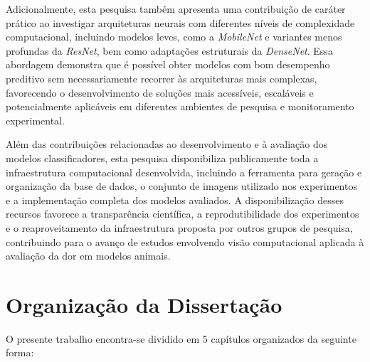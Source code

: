 Adicionalmente, esta pesquisa também apresenta uma contribuição de caráter prático ao investigar arquiteturas neurais com diferentes níveis de complexidade computacional, incluindo modelos leves, como a \textit{MobileNet} e variantes menos profundas da \textit{ResNet}, bem como adaptações estruturais da \textit{DenseNet}. Essa abordagem demonstra que é possível obter modelos com bom desempenho preditivo sem necessariamente recorrer às arquiteturas mais complexas, favorecendo o desenvolvimento de soluções mais acessíveis, escaláveis e potencialmente aplicáveis em diferentes ambientes de pesquisa e monitoramento experimental.

Além das contribuições relacionadas ao desenvolvimento e à avaliação dos modelos classificadores, esta pesquisa disponibiliza publicamente toda a infraestrutura computacional desenvolvida, incluindo a ferramenta para geração e organização da base de dados, o conjunto de imagens utilizado nos experimentos e a implementação completa dos modelos avaliados. A disponibilização desses recursos favorece a transparência científica, a reprodutibilidade dos experimentos e o reaproveitamento da infraestrutura proposta por outros grupos de pesquisa, contribuindo para o avanço de estudos envolvendo visão computacional aplicada à avaliação da dor em modelos animais.

\section{Organização da Dissertação}

O presente trabalho encontra-se dividido em 5 capítulos organizados da seguinte forma:

